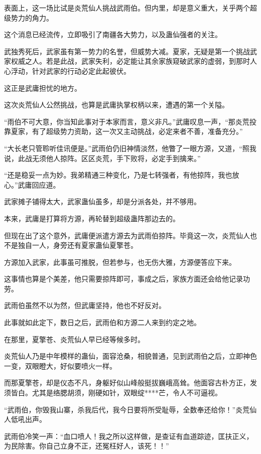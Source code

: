 \begin{this_body}
表面上，这一场比试是炎荒仙人挑战武雨伯。但内里，却是意义重大，关乎两个超级势力的角力。

这个消息已经流传，立即吸引了南疆各大势力，以及蛊仙强者的关注。

武独秀死后，武家虽有第一势力的名誉，但威势大减。夏家，无疑是第一个挑战武家权威之人。若是此战，武家失利，必定能让其余家族窥破武家的虚弱，到那时人心浮动，针对武家的行动必定此起彼伏。

这正是武庸担忧的地方。

这次炎荒仙人公然挑战，也算是武庸执掌权柄以来，遭遇的第一个关隘。

“雨伯不可大意，你当知此事对于本家而言，意义非凡。”武庸叹息一声，“那炎荒投靠夏家，有了超级势力资助，这一次又主动挑战，必定来者不善，准备充分。”

“大长老只管聆听佳讯便是。”武雨伯仍旧神情淡然，他瞥了一眼方源，又道，“照我说，此战无须他人掠阵。区区炎荒，手下败将，必定手到擒来。”

“还是稳妥一点为妙。我弟精通三种变化，乃是七转强者，有他掠阵，我也放心。”武庸回应道。

武家摊子铺得太大，武家蛊仙虽多，却是分派各处，并不够用。

本来，武庸是打算将方源，再轮替到超级蛊阵那边去的。

但现在出了这个意外，武庸便派遣方源去为武雨伯掠阵。毕竟这一次，炎荒仙人也不是独自一人，身旁还有夏家蛊仙夏擎苍。

方源加入武家，此事虽可推脱，但若参与，也无伤大雅，方源便答应下来。

这事情也算是个美差，他只需要掠阵即可，事成之后，家族方面还会给他记录功劳。

武雨伯虽然不以为然，但武庸坚持，他也不好反对。

此事就如此定下，数日之后，武雨伯和方源二人来到约定之地。

在那里，夏擎苍、炎荒仙人早已经等候多时。

炎荒仙人乃是中年模样的蛊仙，面容沧桑，相貌普通，见到武雨伯之后，立即神色一变，双眼瞪大，好似要喷火一样。

而那夏擎苍，却是仪态不凡，身躯好似山峰般挺拔巍峨高耸。他面容古朴方正，发须皆白。尤其是络腮胡须，刚硬如针，双眼绽****芒，令人不可逼视。

“武雨伯，你毁我山寨，杀我后代，我今日要将所受耻辱，全数奉还给你！”炎荒仙人低吼出声。

武雨伯冷笑一声：“血口喷人！我之所以这样做，是查证有血道踪迹，匡扶正义，为民除害。你自己立身不正，还冤枉好人，该死！！”


\end{this_body}
